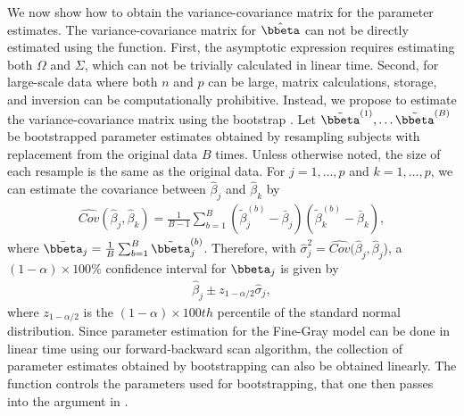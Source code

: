 We now show how to obtain the variance-covariance matrix for the parameter estimates. The variance-covariance matrix for $\hat{\bbeta}$ can not be directly estimated using the  function. First, the asymptotic expression requires estimating both $\Omega$ and $\Sigma$, which can not be trivially calculated in linear time. Second, for large-scale data where both $n$ and $p$ can be large, matrix calculations, storage, and inversion can be computationally prohibitive. Instead, we propose to estimate the variance-covariance matrix using the bootstrap \citep{efron1979bootstrap}.  Let $\tilde{\bbeta}^{(1)}, \ldots \tilde{\bbeta}^{(B)}$ be bootstrapped parameter estimates obtained by resampling subjects with replacement from the original data $B$ times. Unless otherwise noted, the size of each resample is the same as the original data. For $j = 1, \ldots, p$ and $k = 1, \ldots, p$, we can estimate the covariance between $\hat{\beta}_j$ and $\hat{\beta}_k$ by
 \begin{align}
\widehat{Cov}(\hat{\beta}_j, \hat{\beta}_k) = \frac{1}{B - 1} \sum_{b = 1}^B (\tilde{\beta}^{(b)}_{j} - \bar{\beta}_j)(\tilde{\beta}^{(b)}_{k} - \bar{\beta}_k),
\end{align}
where $\bar{\bbeta}_j = \frac{1}{B} \sum_{b=1}^B \tilde{\bbeta}^{(b)}_{j}$. Therefore, with $\hat{\sigma}^2_j = \widehat{Cov}(\hat{\beta}_j, \hat{\beta}_j$), a $(1 - \alpha) \times 100\%$ confidence interval for $\bbeta_j$ is given by
\begin{align}
\hat{\beta}_j \pm z_{1-\alpha/2} \hat{\sigma}_j,
\end{align}
where $z_{1 - \alpha / 2}$ is the $(1 - \alpha) \times 100th$ percentile of the standard normal distribution. Since parameter estimation for the Fine-Gray model can be done in linear time using our forward-backward scan algorithm, the collection of parameter estimates obtained by bootstrapping can also be obtained linearly. The  function controls the parameters used for bootstrapping, that one then passes into the  argument in .
